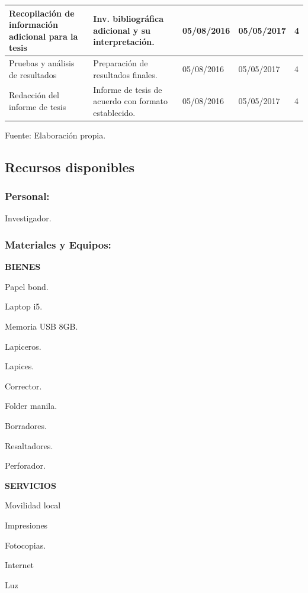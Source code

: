 \documentclass[a4paper, 12pt]{article}
\begin{document}
\begin{table}[h!]
\begin{tabular}{|p{3cm} |p{4cm} |p{2.2cm} |p{2.6cm} |p{2.3cm}|}
Recopilación de información adicional para la tesis & Inv. bibliográfica adicional y su interpretación.  & 05/08/2016 & 05/05/2017 & 4  \\ \hline

Pruebas y análisis de resultados & Preparación de resultados finales.  & 05/08/2016 & 05/05/2017 & 4  \\ \hline


Redacción del informe de tesis & Informe de tesis de acuerdo con formato establecido.  & 05/08/2016 & 05/05/2017 & 4  \\ \hline
\end{tabular}
\begin{center}
\vskip -0.2cm
{\small{Fuente: Elaboración propia.}}
\end{center}
\end{table}




\subsection{Recursos disponibles}
\subsubsection{{\bf Personal:}} Investigador.
\subsubsection{ {\bf	Materiales y Equipos:}} 
{\bf BIENES}
\begin{description}
	\item Papel bond.
	\item Laptop i5.
	\item Memoria USB 8GB.
	\item Lapiceros.
	\item Lapices.
	\item Corrector.
	\item Folder manila.
	\item Borradores.
	\item Resaltadores.
	\item Perforador.
\end{description}

{\bf SERVICIOS}
\begin{description}
	\item Movilidad local
	\item Impresiones
	\item Fotocopias.
	\item Internet
	\item Luz
\end{description}
\end{document}
